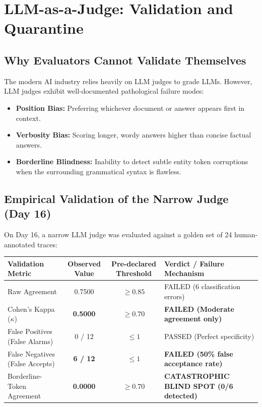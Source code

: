 \vspace{12pt}
\section{LLM-as-a-Judge: Validation and Quarantine}

\subsection{Why Evaluators Cannot Validate Themselves}
The modern AI industry relies heavily on LLM judges to grade LLMs. However, LLM judges exhibit well-documented pathological failure modes:
\begin{itemize}
    \item \textbf{Position Bias:} Preferring whichever document or answer appears first in context.
    \item \textbf{Verbosity Bias:} Scoring longer, wordy answers higher than concise factual answers.
    \item \textbf{Borderline Blindness:} Inability to detect subtle entity token corruptions when the surrounding grammatical syntax is flawless.
\end{itemize}

\subsection{Empirical Validation of the Narrow Judge (Day 16)}
On Day 16, a narrow LLM judge was evaluated against a golden set of 24 human-annotated traces:
\begin{center}
\small
\begin{tabularx}{\textwidth}{lccX}
\toprule
\textbf{Validation Metric} & \textbf{Observed Value} & \textbf{Pre-declared Threshold} & \textbf{Verdict / Failure Mechanism} \\
\midrule
Raw Agreement & 0.7500 & $\ge 0.85$ & FAILED (6 classification errors) \\
Cohen's Kappa ($\kappa$) & \textbf{0.5000} & $\ge 0.70$ & \textbf{FAILED (Moderate agreement only)} \\
False Positives (False Alarms) & 0 / 12 & $\le 1$ & PASSED (Perfect specificity) \\
False Negatives (False Accepts) & \textbf{6 / 12} & $\le 1$ & \textbf{FAILED (50\% false acceptance rate)} \\
Borderline-Token Agreement & \textbf{0.0000} & $\ge 0.70$ & \textbf{CATASTROPHIC BLIND SPOT (0/6 detected)} \\
\bottomrule
\end{tabularx}
\end{center}

